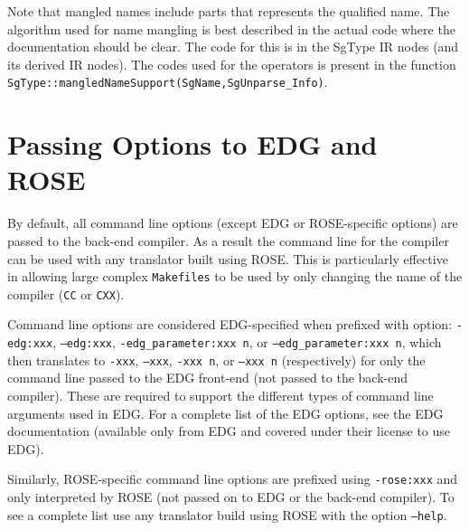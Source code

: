    Note that mangled names include parts that represents the qualified name.
The algorithm used for name mangling is best described in the actual code
where the documentation should be clear. The code for this is in the 
SgType IR nodes (and its derived IR nodes).  The codes used for the operators is
present in the function {\tt SgType::mangledNameSupport(SgName,SgUnparse\_Info)}.

\section{Passing Options to EDG and ROSE}

    By default, all command line options (except EDG or ROSE-specific options) are 
passed to the back-end compiler.  As a result the command line for the compiler
can be used with any translator built using ROSE.  This is particularly effective
in allowing large complex {\tt Makefiles} to be used by only changing the name of the 
compiler ({\tt CC} or {\tt CXX}).

    Command line options are considered EDG-specified when prefixed with 
option: {\tt -edg:xxx}, {\tt --edg:xxx}, {\tt -edg\_parameter:xxx n}, or 
{\tt --edg\_parameter:xxx n}, which then translates to {\tt -xxx}, {\tt --xxx}, 
{\tt -xxx n}, or {\tt --xxx n} (respectively) for only the command line passed to 
the EDG front-end (not passed to the back-end compiler).  These are
required to support the different types of command line arguments used in EDG.
For a complete list of the EDG options, see the EDG documentation (available 
only from EDG and covered under their license to use EDG).

     Similarly, ROSE-specific command line options are prefixed using {\tt -rose:xxx}
and only interpreted by ROSE (not passed on to EDG or the back-end compiler).  To see 
a complete list use any translator build using ROSE with the option {\tt --help}.

